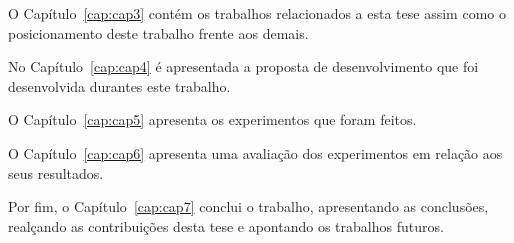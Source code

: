 O Capítulo~\ref{cap:cap3} contém os trabalhos relacionados a esta tese assim como o posicionamento deste trabalho frente aos demais.

No Capítulo~\ref{cap:cap4} é apresentada a proposta de desenvolvimento que foi desenvolvida durantes este trabalho. 

O Capítulo~\ref{cap:cap5} apresenta os experimentos que foram feitos. 

O Capítulo~\ref{cap:cap6} apresenta uma avaliação dos experimentos em relação aos seus resultados.

Por fim, o Capítulo~\ref{cap:cap7} conclui o trabalho, apresentando as conclusões, realçando as contribuições desta tese e apontando os  trabalhos futuros.



